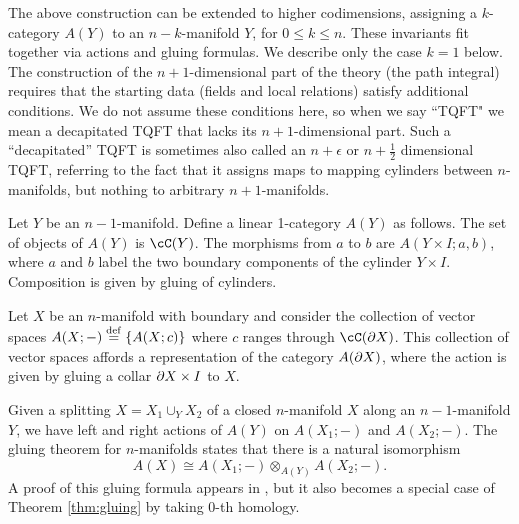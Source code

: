 The above construction can be extended to higher codimensions, assigning
a $k$-category $A(Y)$ to an $n{-}k$-manifold $Y$, for $0 \le k \le n$.
These invariants fit together via actions and gluing formulas.
We describe only the case $k=1$ below.
The construction of the $n{+}1$-dimensional part of the theory (the path integral) 
requires that the starting data (fields and local relations) satisfy additional
conditions.
We do not assume these conditions here, so when we say ``TQFT" we mean a decapitated TQFT
that lacks its $n{+}1$-dimensional part. Such a ``decapitated'' TQFT is sometimes also called an $n+\epsilon$ or $n+\frac{1}{2}$ dimensional TQFT, referring to the fact that it assigns maps to mapping cylinders between $n$-manifolds, but nothing to arbitrary $n{+}1$-manifolds.

Let $Y$ be an $n{-}1$-manifold.
Define a linear 1-category $A(Y)$ as follows.
The set of objects of $A(Y)$ is $\cC(Y)$.
The morphisms from $a$ to $b$ are $A(Y\times I; a, b)$, 
where $a$ and $b$ label the two boundary components of the cylinder $Y\times I$.
Composition is given by gluing of cylinders.

Let $X$ be an $n$-manifold with boundary and consider the collection of vector spaces
$A(X; -) \stackrel{\mathrm{def}}{=} \{A(X; c)\}$ where $c$ ranges through $\cC(\bd X)$.
This collection of vector spaces affords a representation of the category $A(\partial X)$, where
the action is given by gluing a collar $\partial X\times I$ to $X$.

Given a splitting $X = X_1 \cup_Y X_2$ of a closed $n$-manifold $X$ along an $n{-}1$-manifold $Y$,
we have left and right actions of $A(Y)$ on $A(X_1; -)$ and $A(X_2; -)$.
The gluing theorem for $n$-manifolds states that there is a natural isomorphism
\[
	A(X) \cong A(X_1; -) \otimes_{A(Y)} A(X_2; -) .
\]
A proof of this gluing formula appears in \cite{kw:tqft}, but it also becomes a special case of Theorem \ref{thm:gluing} by taking $0$-th homology.
